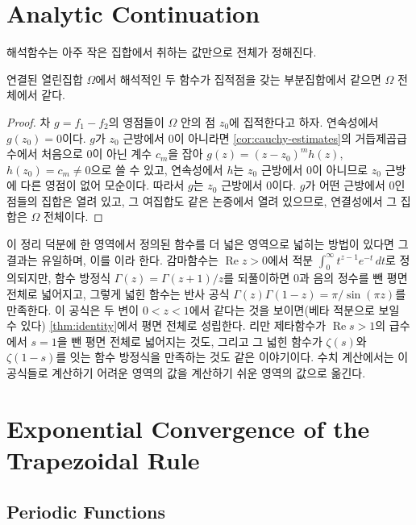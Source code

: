 \section{Analytic Continuation}
\label{sec:continuation}

해석함수는 아주 작은 집합에서 취하는 값만으로 전체가 정해진다.

\begin{theorem}[일치 정리]
\label{thm:identity}
연결된 열린집합 $\Omega$에서 해석적인 두 함수가 집적점을 갖는 부분집합에서 같으면 $\Omega$ 전체에서 같다.
\end{theorem}

\begin{proof}
차 $g=f_1-f_2$의 영점들이 $\Omega$ 안의 점 $z_0$에 집적한다고 하자. 연속성에서 $g(z_0)=0$이다. $g$가 $z_0$ 근방에서 $0$이 아니라면 \cref{cor:cauchy-estimates}의 거듭제곱급수에서 처음으로 $0$이 아닌 계수 $c_m$을 잡아 $g(z)=(z-z_0)^m h(z)$, $h(z_0)=c_m\ne0$으로 쓸 수 있고, 연속성에서 $h$는 $z_0$ 근방에서 $0$이 아니므로 $z_0$ 근방에 다른 영점이 없어 모순이다. 따라서 $g$는 $z_0$ 근방에서 $0$이다. $g$가 어떤 근방에서 $0$인 점들의 집합은 열려 있고, 그 여집합도 같은 논증에서 열려 있으므로, 연결성에서 그 집합은 $\Omega$ 전체이다.
\end{proof}

이 정리 덕분에 한 영역에서 정의된 함수를 더 넓은 영역으로 넓히는 방법이 있다면 그 결과는 유일하며, 이를 이라 한다. 감마함수는 $\operatorname{Re}z>0$에서 적분 $\int_0^\infty t^{z-1}e^{-t}\,dt$로 정의되지만, 함수 방정식 $\Gamma(z)=\Gamma(z+1)/z$를 되풀이하면 $0$과 음의 정수를 뺀 평면 전체로 넓어지고, 그렇게 넓힌 함수는 반사 공식 $\Gamma(z)\Gamma(1-z)=\pi/\sin(\pi z)$를 만족한다. 이 공식은 두 변이 $0<z<1$에서 같다는 것을 보이면(베타 적분으로 보일 수 있다) \cref{thm:identity}에서 평면 전체로 성립한다. 리만 제타함수가 $\operatorname{Re}s>1$의 급수에서 $s=1$을 뺀 평면 전체로 넓어지는 것도, 그리고 그 넓힌 함수가 $\zeta(s)$와 $\zeta(1-s)$를 잇는 함수 방정식을 만족하는 것도 같은 이야기이다. 수치 계산에서는 이 공식들로 계산하기 어려운 영역의 값을 계산하기 쉬운 영역의 값으로 옮긴다.

\section{Exponential Convergence of the Trapezoidal Rule}
\label{sec:trapezoid}

\subsection{Periodic Functions}

